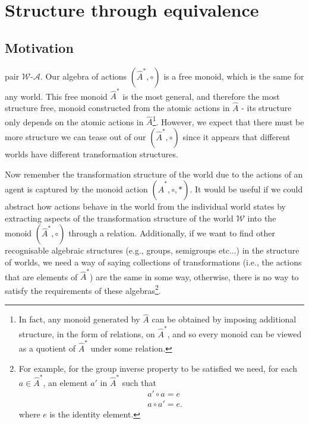\section{Structure through equivalence}
\subsection{Motivation}


 pair $\mathscr{W}$-$\mathscr{A}$.
Our algebra of actions $(\hat{A}^{*}, \circ)$ is a free monoid, which is the same for any world.
This free monoid $\hat{A}^{*}$ is the most general, and therefore the most structure free, monoid constructed from the atomic actions in $\hat{A}$ - its structure only depends on the atomic actions in $\hat{A}$\footnote{
In fact, any monoid generated by $\hat{A}$ can be obtained by imposing additional structure, in the form of relations, on $\hat{A}^{*}$, and so every monoid can be viewed as a quotient of $\hat{A}^{*}$ under some relation.
}.
However, we expect that there must be more structure we can tease out of our $(\hat{A}^{*}, \circ)$ since it appears that different worlds have different transformation structures.

Now remember the transformation structure of the world due to the actions of an agent is captured by the monoid action $(\hat{A}^{*}, \circ, \ast)$.
It would be useful if we could abstract how actions behave in the world from the individual world states by extracting aspects of the transformation structure of the world $\mathscr{W}$ into the monoid $(\hat{A}^{*}, \circ)$ through a relation.
Additionally, if we want to find other recognisable algebraic structures (e.g., groups, semigroups etc...) in the structure of worlds, we need a way of saying collections of transformations (i.e., the actions that are elements of $\hat{A}^{*}$) are the same in some way, otherwise, there is no way to satisfy the requirements of these algebras\footnote{
For example, for the group inverse property to be satisfied we need, for each $a \in \hat{A}^{*}$, an element $a'$ in $\hat{A}^{*}$ such that
\begin{align}
    & a' \circ a = e \\
    & a \circ a' = e.
\end{align}
where $e$ is the identity element.
}.

